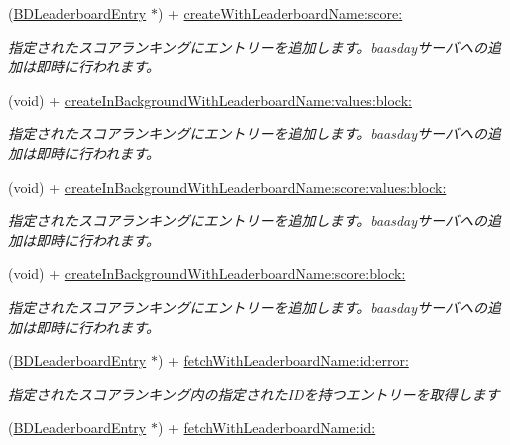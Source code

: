 \begin{DoxyCompactItemize}
(\hyperlink{interface_b_d_leaderboard_entry}{B\-D\-Leaderboard\-Entry} $\ast$) + \hyperlink{interface_b_d_leaderboard_entry_abf597d94d3ba7b7a88148914e1c5c069}{create\-With\-Leaderboard\-Name\-:score\-:}
\begin{DoxyCompactList}\small\item\em 指定されたスコアランキングにエントリーを追加します。baasdayサーバへの追加は即時に行われます。 \end{DoxyCompactList}\item 
(void) + \hyperlink{interface_b_d_leaderboard_entry_aed52cbb76eafcf6a1c2566fd64d3ce4a}{create\-In\-Background\-With\-Leaderboard\-Name\-:values\-:block\-:}
\begin{DoxyCompactList}\small\item\em 指定されたスコアランキングにエントリーを追加します。baasdayサーバへの追加は即時に行われます。 \end{DoxyCompactList}\item 
(void) + \hyperlink{interface_b_d_leaderboard_entry_a83aa7a78bd7b5774ae4279c9b82bb18c}{create\-In\-Background\-With\-Leaderboard\-Name\-:score\-:values\-:block\-:}
\begin{DoxyCompactList}\small\item\em 指定されたスコアランキングにエントリーを追加します。baasdayサーバへの追加は即時に行われます。 \end{DoxyCompactList}\item 
(void) + \hyperlink{interface_b_d_leaderboard_entry_a2969022a59761d4ce19fb714d29c92f7}{create\-In\-Background\-With\-Leaderboard\-Name\-:score\-:block\-:}
\begin{DoxyCompactList}\small\item\em 指定されたスコアランキングにエントリーを追加します。baasdayサーバへの追加は即時に行われます。 \end{DoxyCompactList}\item 
(\hyperlink{interface_b_d_leaderboard_entry}{B\-D\-Leaderboard\-Entry} $\ast$) + \hyperlink{interface_b_d_leaderboard_entry_af09f43559e01ccb2ed4aa23c2d373c23}{fetch\-With\-Leaderboard\-Name\-:id\-:error\-:}
\begin{DoxyCompactList}\small\item\em 指定されたスコアランキング内の指定された\-I\-Dを持つエントリーを取得します \end{DoxyCompactList}\item 
(\hyperlink{interface_b_d_leaderboard_entry}{B\-D\-Leaderboard\-Entry} $\ast$) + \hyperlink{interface_b_d_leaderboard_entry_ae97c53b9113fe6b092830d79618c4ae8}{fetch\-With\-Leaderboard\-Name\-:id\-:}

\end{DoxyCompactItemize}
